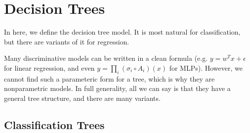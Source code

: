 \section{Decision Trees} 

  In here, we define the decision tree model. It is most natural for classification, but there are variants of it for regression.   

  Many discriminative models can be written in a clean formula (e.g. $y = w^T x + \epsilon$ for linear regression, and even $y = \prod_i (\sigma_i \circ A_i) (x)$ for MLPs). However, we cannot find such a parameteric form for a tree, which is why they are nonparametric models. In full generality, all we can say is that they have a general tree structure, and there are many variants. 

\subsection{Classification Trees}

